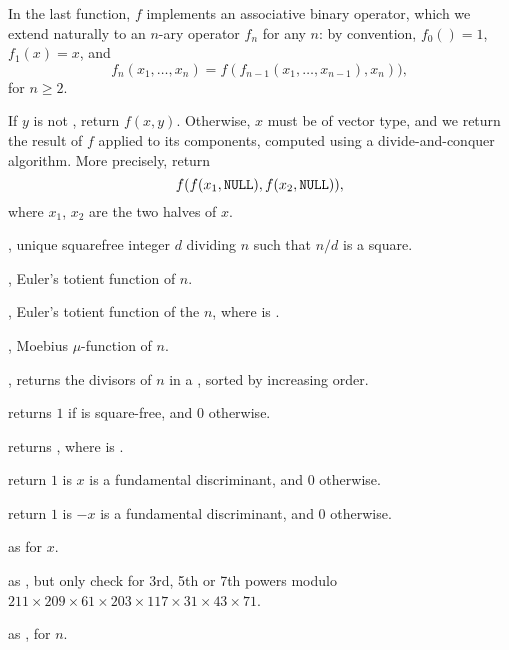 
In the last function, $f$ implements an associative binary operator, which we
extend naturally to an $n$-ary operator $f_n$ for any $n$: by convention,
$f_0() = 1$, $f_1(x) = x$, and
$$ f_n(x_1,\dots,x_n) = f( f_{n-1}(x_1,\dots,x_{n-1}), x_n)),$$
for $n \geq 2$.

 If $y$ is not
, return $f(x,y)$. Otherwise, $x$ must be of vector type, and we
return the result of $f$ applied to its components, computed using a
divide-and-conquer algorithm. More precisely, return
$$f( f(x_1,{\tt NULL}), f(x_2,{\tt NULL}) ),$$
where $x_1$, $x_2$ are the two halves of $x$.


, unique squarefree integer $d$ dividing $n$ such
that $n/d$ is a square.

, Euler's totient function of $n$.

, Euler's totient function of the
 $n$, where  is .

, Moebius $\mu$-function of $n$.

, returns the divisors of $n$ in a
, sorted by increasing order.

 returns $1$ if 
is square-free, and $0$ otherwise.

 returns , where
 is .

 return $1$ is $x$ is a fundamental
discriminant, and $0$ otherwise.

 return $1$ is $-x$ is a fundamental
discriminant, and $0$ otherwise.

 as 
for  $x$.

 as , but
only check for 3rd, 5th or 7th powers modulo
$211\times209\times61\times203\times117\times31\times43\times71$.

 as , for
 $n$.

